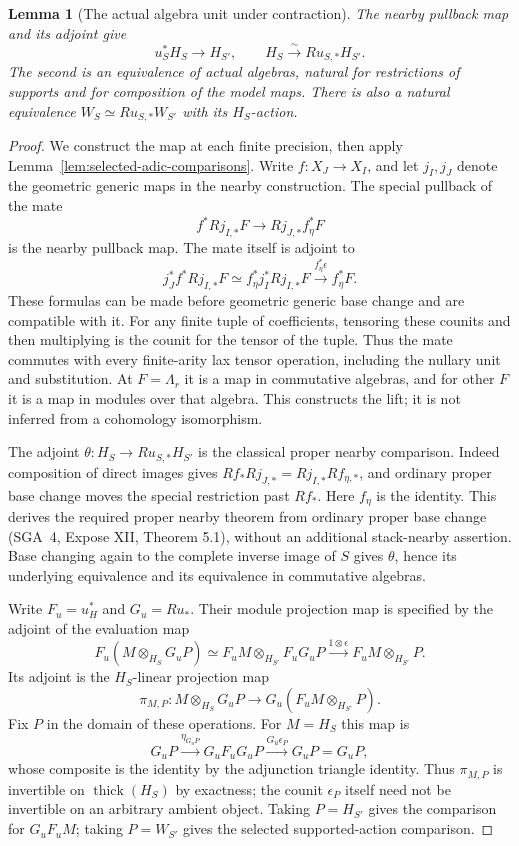 \documentclass[11pt]{article}
\newtheorem{lemma}[theorem]{Lemma}
\theoremstyle{definition}
\theoremstyle{remark}
\newcommand{\thick}{\operatorname{thick}}
\begin{document}
\begin{lemma}[The actual algebra unit under contraction]
\label{lem:cell-algebra-unit}
The nearby pullback map and its adjoint give
\[
 u_S^*H_S\longrightarrow H_{S'},\qquad
 H_S\xrightarrow{\sim}Ru_{S,*}H_{S'}.
\]
The second is an equivalence of actual algebras, natural for
restrictions of supports and for composition of the model maps.
There is also a natural equivalence
$W_S\simeq Ru_{S,*}W_{S'}$ with its $H_S$-action.
\end{lemma}
\begin{proof}
We construct the map at each finite precision, then apply
Lemma~\ref{lem:selected-adic-comparisons}.  Write $f:X_J\to X_I$,
and let $j_I,j_J$ denote the geometric generic maps in the nearby
construction.  The special pullback of the mate
\[
 f^*Rj_{I,*}F\longrightarrow Rj_{J,*}f_\eta^*F
\]
is the nearby pullback map.  The mate itself is adjoint to
\[
 j_J^*f^*Rj_{I,*}F
       \simeq f_\eta^*j_I^*Rj_{I,*}F
       \xrightarrow{f_\eta^*\epsilon}f_\eta^*F.
\]
These formulas can be made before geometric generic base change and
are compatible with it.  For any finite tuple of coefficients,
tensoring these counits and then multiplying is the counit for the
tensor of the tuple.  Thus the mate commutes with every finite-arity
lax tensor operation, including the nullary unit and substitution.
At $F=\Lambda_r$ it is a map in commutative algebras, and for other
$F$ it is a map in modules over that algebra.  This constructs the
lift; it is not inferred from a cohomology isomorphism.

The adjoint $\theta:H_S\to Ru_{S,*}H_{S'}$ is the classical proper
nearby comparison.  Indeed composition of direct images gives
$Rf_*Rj_{J,*}=Rj_{I,*}Rf_{\eta,*}$, and ordinary proper base change
moves the special restriction past $Rf_*$.  Here $f_\eta$ is the
identity.  This derives the required proper nearby theorem from
ordinary proper base change (SGA~4, Expose XII, Theorem 5.1), without
an additional stack-nearby assertion.  Base changing again to the
complete inverse image of $S$ gives $\theta$, hence its underlying
equivalence and its equivalence in commutative algebras.

Write $F_u=u_H^*$ and $G_u=Ru_*$.  Their module projection map is
specified by the adjoint of the evaluation map
\[
 F_u(M\otimes_{H_S}G_uP)\simeq
 F_uM\otimes_{H_{S'}}F_uG_uP
 \xrightarrow{1\otimes\epsilon}F_uM\otimes_{H_{S'}}P.
\]
Its adjoint is the $H_S$-linear projection map
\[
 \pi_{M,P}:M\otimes_{H_S}G_uP\longrightarrow
                 G_u(F_uM\otimes_{H_{S'}}P).
\]
Fix $P$ in the domain of these operations.  For $M=H_S$ this map is
\[
 G_uP\xrightarrow{\eta_{G_uP}}G_uF_uG_uP
       \xrightarrow{G_u\epsilon_P}G_uP=G_uP,
\]
whose composite is the identity by the adjunction triangle identity.
Thus $\pi_{M,P}$ is invertible on $\thick(H_S)$ by exactness; the
counit $\epsilon_P$ itself need not be invertible on an arbitrary
ambient object.  Taking $P=H_{S'}$ gives the comparison for $G_uF_uM$;
taking $P=W_{S'}$ gives the selected supported-action comparison.


\end{proof}
\end{document}

